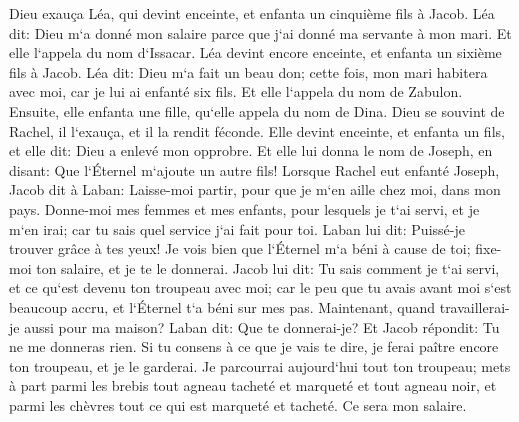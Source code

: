 \verse Dieu exauça Léa, qui devint enceinte, et enfanta un cinquième fils à Jacob. 
\verse Léa dit: Dieu m`a donné mon salaire parce que j`ai donné ma servante à mon mari. Et elle l`appela du nom d`Issacar. 
\verse Léa devint encore enceinte, et enfanta un sixième fils à Jacob. 
\verse Léa dit: Dieu m`a fait un beau don; cette fois, mon mari habitera avec moi, car je lui ai enfanté six fils. Et elle l`appela du nom de Zabulon. 
\verse Ensuite, elle enfanta une fille, qu`elle appela du nom de Dina. 
\verse Dieu se souvint de Rachel, il l`exauça, et il la rendit féconde. 
\verse Elle devint enceinte, et enfanta un fils, et elle dit: Dieu a enlevé mon opprobre. 
\verse Et elle lui donna le nom de Joseph, en disant: Que l`Éternel m`ajoute un autre fils! 
\verse Lorsque Rachel eut enfanté Joseph, Jacob dit à Laban: Laisse-moi partir, pour que je m`en aille chez moi, dans mon pays. 
\verse Donne-moi mes femmes et mes enfants, pour lesquels je t`ai servi, et je m`en irai; car tu sais quel service j`ai fait pour toi. 
\verse Laban lui dit: Puissé-je trouver grâce à tes yeux! Je vois bien que l`Éternel m`a béni à cause de toi; 
\verse fixe-moi ton salaire, et je te le donnerai. 
\verse Jacob lui dit: Tu sais comment je t`ai servi, et ce qu`est devenu ton troupeau avec moi; 
\verse car le peu que tu avais avant moi s`est beaucoup accru, et l`Éternel t`a béni sur mes pas. Maintenant, quand travaillerai-je aussi pour ma maison? 
\verse Laban dit: Que te donnerai-je? Et Jacob répondit: Tu ne me donneras rien. Si tu consens à ce que je vais te dire, je ferai paître encore ton troupeau, et je le garderai. 
\verse Je parcourrai aujourd`hui tout ton troupeau; mets à part parmi les brebis tout agneau tacheté et marqueté et tout agneau noir, et parmi les chèvres tout ce qui est marqueté et tacheté. Ce sera mon salaire. 

